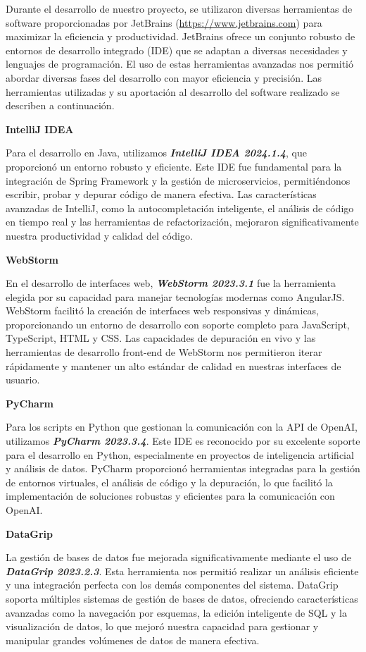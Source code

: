 Durante el desarrollo de nuestro proyecto, se utilizaron diversas herramientas de software proporcionadas por JetBrains (\url{https://www.jetbrains.com}) para maximizar la eficiencia y productividad. JetBrains ofrece un conjunto robusto de entornos de desarrollo integrado (IDE) que se adaptan a diversas necesidades y lenguajes de programación. El uso de estas herramientas avanzadas nos permitió abordar diversas fases del desarrollo con mayor eficiencia y precisión. Las herramientas utilizadas y su aportación al desarrollo del software realizado se describen a continuación.

\textbf{IntelliJ IDEA}

Para el desarrollo en Java, utilizamos \textbf{\textit{IntelliJ IDEA 2024.1.4}}, que proporcionó un entorno robusto y eficiente. Este IDE fue fundamental para la integración de Spring Framework y la gestión de microservicios, permitiéndonos escribir, probar y depurar código de manera efectiva. Las características avanzadas de IntelliJ, como la autocompletación inteligente, el análisis de código en tiempo real y las herramientas de refactorización, mejoraron significativamente nuestra productividad y calidad del código.

\textbf{WebStorm}

En el desarrollo de interfaces web, \textbf{\textit{WebStorm 2023.3.1}} fue la herramienta elegida por su capacidad para manejar tecnologías modernas como AngularJS. WebStorm facilitó la creación de interfaces web responsivas y dinámicas, proporcionando un entorno de desarrollo con soporte completo para JavaScript, TypeScript, HTML y CSS. Las capacidades de depuración en vivo y las herramientas de desarrollo front-end de WebStorm nos permitieron iterar rápidamente y mantener un alto estándar de calidad en nuestras interfaces de usuario.

\textbf{PyCharm}

Para los scripts en Python que gestionan la comunicación con la API de OpenAI, utilizamos \textbf{\textit{PyCharm 2023.3.4}}. Este IDE es reconocido por su excelente soporte para el desarrollo en Python, especialmente en proyectos de inteligencia artificial y análisis de datos. PyCharm proporcionó herramientas integradas para la gestión de entornos virtuales, el análisis de código y la depuración, lo que facilitó la implementación de soluciones robustas y eficientes para la comunicación con OpenAI.

\textbf{DataGrip}

La gestión de bases de datos fue mejorada significativamente mediante el uso de \textbf{\textit{DataGrip 2023.2.3}}. Esta herramienta nos permitió realizar un análisis eficiente y una integración perfecta con los demás componentes del sistema. DataGrip soporta múltiples sistemas de gestión de bases de datos, ofreciendo características avanzadas como la navegación por esquemas, la edición inteligente de SQL y la visualización de datos, lo que mejoró nuestra capacidad para gestionar y manipular grandes volúmenes de datos de manera efectiva.

